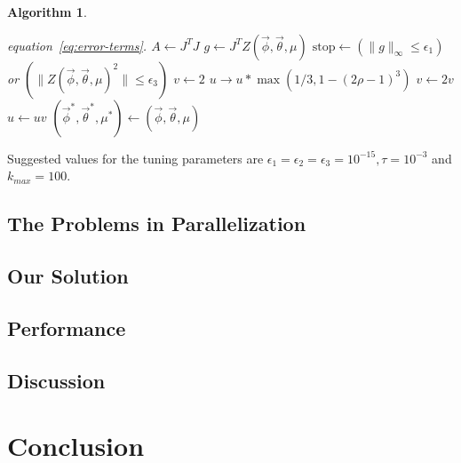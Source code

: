 \documentclass[english,12pt]{article}
\theoremstyle{algorithm}
\newtheorem{algorithm}{Algorithm}[section]
\begin{document}
\begin{algorithm}
\begin{algorithmic}[1]
                    equation~\ref{eq:error-terms}.
					\State $A \leftarrow J^T J$
					\State $g \leftarrow J^T Z(\vec{\phi},\vec{\theta},\mu)$
					\State $ \text{stop} \leftarrow (\|g\|_{\infty} \le \epsilon_1)$ or $(\| Z(\vec{\phi},\vec{\theta},\mu)^2 \| \le \epsilon_3)$  
					\State $v \leftarrow 2$
					\State $u \rightarrow u * \max(1/3, 1 - (2\rho - 1)^3 )$
				\Else  {}
					\State $v \leftarrow 2 v$
					\State $u \leftarrow u v$
				\EndIf
			\EndIf
	\EndWhile
	\State $(\vec{\phi}^*,\vec{\theta}^*,\mu^*) \leftarrow (\vec{\phi},\vec{\theta},\mu)$
\end{algorithmic}
\label{alg:LM}
\end{algorithm}

Suggested values for the tuning parameters are $\epsilon_1 = \epsilon_2 =
\epsilon_3 = 10^{-15}, \tau = 10^{-3}$ and $k_{max} = 100$.

\subsection{The Problems in Parallelization}


\subsection{Our Solution}


\subsection{Performance}


\subsection{Discussion}


\section{Conclusion}




\end{document}
